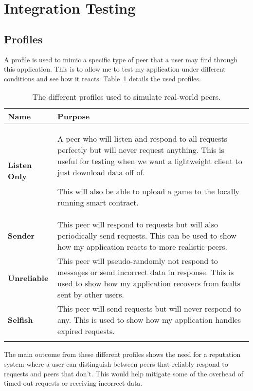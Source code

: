 \section{Integration Testing}

\subsection*{Profiles}

A profile is used to mimic a specific type of peer that a user may find through this application. This is to allow me to test my application under different conditions and see how it reacts. Table~\ref{tab:profiles} details the used profiles.

\small
\begin{longtable}{p{} p{}}
  \toprule
  \textbf{Name} & \textbf{Purpose}
  \\\midrule\midrule
  \textbf{Listen Only}
  & A peer who will listen and respond to all requests perfectly but will never request anything. This is useful for testing when we want a lightweight client to just download data off of. 
  
  This will also be able to upload a game to the locally running smart contract.
  \\
  \textbf{Sender}
  & This peer will respond to requests but will also periodically send requests. This can be used to show how my application reacts to more realistic peers. 
  \\
  \textbf{Unreliable}
  & This peer will pseudo-randomly not respond to messages or send incorrect data in response. This is used to show how my application recovers from faults sent by other users.
  \\
  \textbf{Selfish}
  & This peer will send requests but will never respond to any. This is used to show how my application handles expired requests.
  \\\bottomrule\bottomrule
  \caption{The different profiles used to simulate real-world peers.}
  \label{tab:profiles}
\end{longtable}
\normalsize

\noindent
The main outcome from these different profiles shows the need for a reputation system where a user can distinguish between peers that reliably respond to requests and peers that don't. This would help mitigate some of the overhead of timed-out requests or receiving incorrect data.
